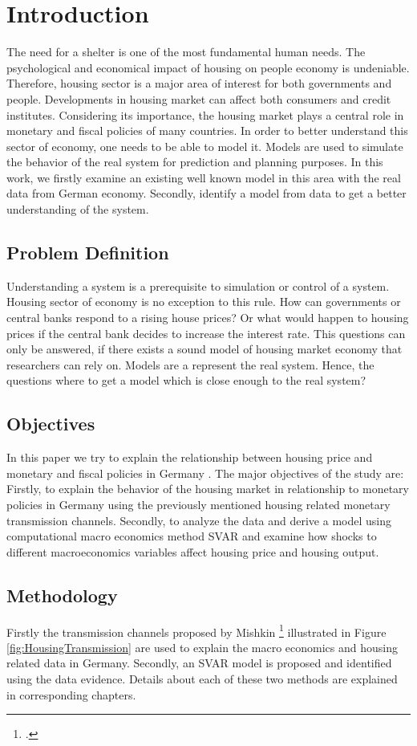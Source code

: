 \section{Introduction} \label{introduction}

The need for a shelter is one of the most fundamental human needs. The psychological and economical impact of housing on people economy is undeniable. Therefore, housing sector is a major area of interest for both governments and people. Developments in housing market can affect both consumers and credit institutes. Considering its importance, the housing market plays a central role in monetary and fiscal policies of many countries. In order to better understand this sector of economy, one needs to be able to model it. Models are used to simulate the behavior of the real system for prediction and planning purposes. In this work, we firstly examine an existing well known model in this area with the real data from German economy. Secondly, identify a model from data to get a better understanding of the system.

\subsection{Problem Definition}
Understanding a system is a prerequisite to simulation or control of a system. Housing sector of economy is no exception to this rule. How can governments or central banks respond to a rising house prices? Or what would happen to housing prices if the central bank decides to increase the interest rate. This questions can only be answered, if there exists a sound model of housing market economy that researchers can rely on. Models are a represent the real system. Hence, the questions where to get a model which is close enough to the real system?


\subsection{Objectives}
In this paper we try to explain the relationship between housing price and monetary and fiscal policies in Germany .
The major objectives of the study are: Firstly, to explain the behavior of the housing market in relationship to monetary policies in Germany using the previously mentioned housing related monetary transmission channels. Secondly, to analyze the data and derive a model using computational macro economics method  \ac{SVAR} and examine how shocks to different macroeconomics variables affect housing price and housing output.

\subsection{Methodology}
Firstly the transmission channels proposed by Mishkin \footcite[See.][]{Mishkin2007} illustrated in Figure \ref{fig:HousingTransmission} are used to explain the macro economics and housing related data in Germany. Secondly, an \ac{SVAR} model is proposed and identified using the data evidence. Details about each of these two methods are explained in corresponding chapters.




